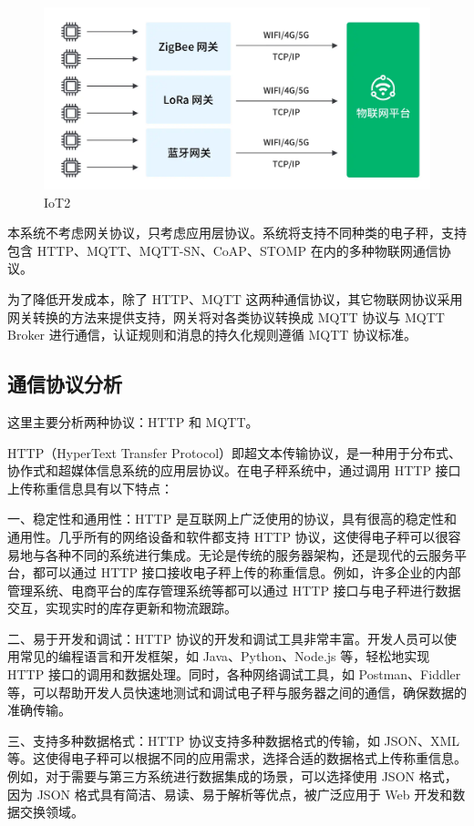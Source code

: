 \begin{figure}[H]
    \centering
    \includegraphics[width=0.8\linewidth]{../design/IoT2.png}
    \caption{IoT2}
    \label{fig:IoT2}
\end{figure}

本系统不考虑网关协议，只考虑应用层协议。系统将支持不同种类的电子秤，支持包含 HTTP、MQTT、MQTT-SN、CoAP、STOMP 在内的多种物联网通信协议。

为了降低开发成本，除了 HTTP、MQTT 这两种通信协议，其它物联网协议采用网关转换的方法来提供支持，网关将对各类协议转换成 MQTT 协议与 MQTT Broker 进行通信，认证规则和消息的持久化规则遵循 MQTT 协议标准。

\subsection{通信协议分析}

这里主要分析两种协议：HTTP 和 MQTT。

HTTP（HyperText Transfer Protocol）即超文本传输协议，是一种用于分布式、协作式和超媒体信息系统的应用层协议。在电子秤系统中，通过调用 HTTP 接口上传称重信息具有以下特点：

一、稳定性和通用性：HTTP 是互联网上广泛使用的协议，具有很高的稳定性和通用性。几乎所有的网络设备和软件都支持 HTTP 协议，这使得电子秤可以很容易地与各种不同的系统进行集成。无论是传统的服务器架构，还是现代的云服务平台，都可以通过 HTTP 接口接收电子秤上传的称重信息。例如，许多企业的内部管理系统、电商平台的库存管理系统等都可以通过 HTTP 接口与电子秤进行数据交互，实现实时的库存更新和物流跟踪\cite{Zhao2016}。

二、易于开发和调试：HTTP 协议的开发和调试工具非常丰富。开发人员可以使用常见的编程语言和开发框架，如 Java、Python、Node.js 等，轻松地实现 HTTP 接口的调用和数据处理。同时，各种网络调试工具，如 Postman、Fiddler 等，可以帮助开发人员快速地测试和调试电子秤与服务器之间的通信，确保数据的准确传输。

三、支持多种数据格式：HTTP 协议支持多种数据格式的传输，如 JSON、XML 等。这使得电子秤可以根据不同的应用需求，选择合适的数据格式上传称重信息。例如，对于需要与第三方系统进行数据集成的场景，可以选择使用 JSON 格式，因为 JSON 格式具有简洁、易读、易于解析等优点，被广泛应用于 Web 开发和数据交换领域。


